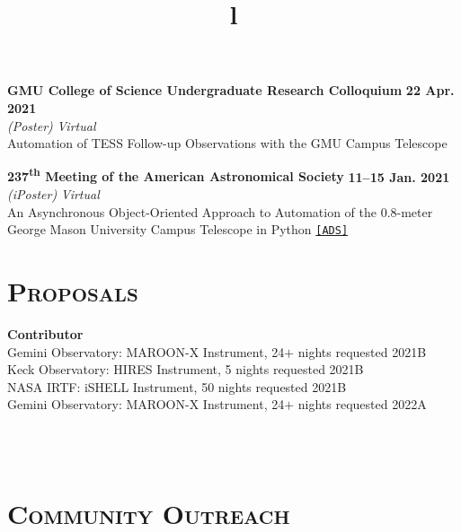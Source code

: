 \documentclass[marg, centered]{res}
\begin{document}
\begin{resume}
\begin{etaremune}
\item \textbf{GMU College of Science Undergraduate Research Colloquium} \hfill \textbf{22 Apr. 2021}\\
\textit{(Poster)} \hfill \textit{Virtual}\\
Automation of TESS Follow-up Observations with the GMU Campus Telescope

\item \textbf{237\textsuperscript{th} Meeting of the American Astronomical Society} \hfill \textbf{11--15 Jan. 2021}\\
\textit{(iPoster)} \hfill \textit{Virtual}\\
An Asynchronous Object-Oriented Approach to Automation of the 0.8-meter\\ George Mason University Campus Telescope in Python \href{https://ui.adsabs.harvard.edu/abs/2021AAS...23734407R/abstract}{\texttt{[ADS]}}



\end{etaremune}


\section{{\scshape \bfseries Proposals}}
\textbf{Contributor} \\
Gemini Observatory: MAROON-X Instrument, 24$+$ nights requested \hfill 2021B \\
Keck Observatory: HIRES Instrument, 5 nights requested \hfill 2021B \\
NASA IRTF: iSHELL Instrument, 50 nights requested \hfill 2021B \\
Gemini Observatory: MAROON-X Instrument, 24$+$ nights requested \hfill 2022A \\

\begin{format}
\title{l} \\
 \\
\body
\end{format}

\section{{\scshape \bfseries Community Outreach}}


\end{resume}
\end{document}
